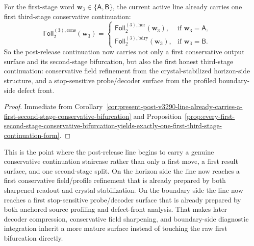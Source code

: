 \begin{corollary}
\label{cor:present-post-v3290-line-already-carries-a-first-third-stage-conservative-continuation}
For the first-stage word \(\mathbf w_3\in\{\mathsf A,\mathsf B\}\), the current active line already carries one first third-stage conservative continuation:
\[
  \mathsf{Foll}^{(3),\mathrm{cons}}_{2}(\mathbf w_3)
  =
  \begin{cases}
    \mathsf{Foll}^{(3),\mathrm{hor}}_{2}(\mathbf w_3), & \text{if }\mathbf w_3=\mathsf A,\\[2mm]
    \mathsf{Foll}^{(3),\mathrm{bdry}}_{2}(\mathbf w_3), & \text{if }\mathbf w_3=\mathsf B.
  \end{cases}
\]
So the post-release continuation now carries not only a first conservative output surface and its second-stage bifurcation, but also the first honest third-stage continuation: conservative field refinement from the crystal-stabilized horizon-side structure, and a stop-sensitive probe/decoder surface from the profiled boundary-side defect front.
\end{corollary}

\begin{proof}
Immediate from Corollary~\ref{cor:present-post-v3290-line-already-carries-a-first-second-stage-conservative-bifurcation} and Proposition~\ref{prop:every-first-second-stage-conservative-bifurcation-yields-exactly-one-first-third-stage-continuation-form}.
\end{proof}

\begin{remark}
\label{rem:what-the-first-third-stage-continuation-now-buys}
This is the point where the post-release line begins to carry a genuine conservative continuation staircase rather than only a first move, a first result surface, and one second-stage split. On the horizon side the line now reaches a first conservative field/profile refinement that is already prepared by both sharpened readout and crystal stabilization. On the boundary side the line now reaches a first stop-sensitive probe/decoder surface that is already prepared by both anchored source profiling and defect-front analysis. That makes later decoder compression, conservative field sharpening, and boundary-side diagnostic integration inherit a more mature surface instead of touching the raw first bifurcation directly.
\end{remark}


